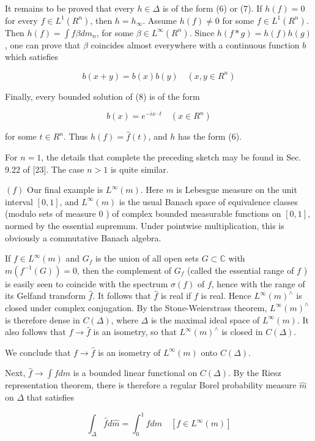 \documentclass[10pt]{article}
\begin{document}
It remains to be proved that every $h \in \Delta$ is of the form (6) or (7). If $h(f)=0$ for every $f \in L^{1}\left(R^{n}\right)$, then $h=h_{\infty}$. Assume $h(f) \neq 0$ for some $f \in L^{1}\left(R^{n}\right)$. Then $h(f)=\int f \beta d m_{n}$, for some $\beta \in L^{\infty}\left(R^{n}\right)$. Since $h(f * g)=h(f) h(g)$, one can prove that $\beta$ coincides almost everywhere with a continuous function $b$ which satisfies

$$
b(x+y)=b(x) b(y) \quad\left(x, y \in R^{n}\right)
$$

Finally, every bounded solution of (8) is of the form

$$
b(x)=e^{-i x \cdot t} \quad\left(x \in R^{n}\right)
$$

for some $t \in R^{n}$. Thus $h(f)=\hat{f}(t)$, and $h$ has the form (6).

For $n=1$, the details that complete the preceding sketch may be found in Sec. 9.22 of [23]. The case $n>1$ is quite similar.

$(f)$ Our final example is $L^{\infty}(m)$. Here $m$ is Lebesgue measure on the unit interval $[0,1]$, and $L^{\infty}(m)$ is the usual Banach space of equivalence classes (modulo sets of measure 0 ) of complex bounded measurable functions on $[0,1]$, normed by the essential supremum. Under pointwise multiplication, this is obviously a commutative Banach algebra.

If $f \in L^{\infty}(m)$ and $G_{f}$ is the union of all open sets $G \subset \mathbb{C}$ with $m\left(f^{-1}(G)\right)=0$, then the complement of $G_{f}$ (called the essential range of $f$ ) is easily seen to coincide with the spectrum $\sigma(f)$ of $f$, hence with the range of its Gelfand transform $\hat{f}$. It follows that $\hat{f}$ is real if $f$ is real. Hence $L^{\infty}(m)^{\wedge}$ is closed under complex conjugation. By the Stone-Weierstrass theorem, $L^{\infty}(m)^{\wedge}$ is therefore dense in $C(\Delta)$, where $\Delta$ is the maximal ideal space of $L^{\infty}(m)$. It also follows that $f \rightarrow \hat{f}$ is an isometry, so that $L^{\infty}(m)^{\wedge}$ is closed in $C(\Delta)$.

We conclude that $f \rightarrow \hat{f}$ is an isometry of $L^{\infty}(m)$ onto $C(\Delta)$.

Next, $\hat{f} \rightarrow \int f d m$ is a bounded linear functional on $C(\Delta)$. By the Riesz representation theorem, there is therefore a regular Borel probability measure $\hat{m}$ on $\Delta$ that satisfies

$$
\int_{\Delta} \hat{f} d \hat{m}=\int_{0}^{1} f d m \quad\left[f \in L^{\infty}(m)\right]
$$
\end{document}
